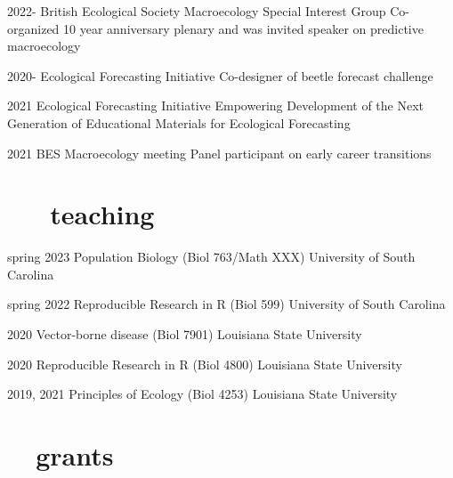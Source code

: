 \documentclass[]{CV}
\begin{document}
\begin{entrylist}

  \entry
    {2022-}
		{British Ecological Society Macroecology Special Interest Group}
    {Co-organized 10 year anniversary plenary and was invited speaker on predictive macroecology}

  \entry
    {2020-}
		{Ecological Forecasting Initiative }
    {Co-designer of beetle forecast challenge}

  \entry
    {2021}
		{Ecological Forecasting Initiative}
    {Empowering Development of the Next Generation of Educational Materials for Ecological Forecasting}

  \entry
    {2021}
		{BES Macroecology meeting}
    {Panel participant on early career transitions}

\end{entrylist}












\section{ \faInstitution \ \ \ teaching}

\begin{entrylist}

  \entry
    {spring 2023}
		{Population Biology (Biol 763/Math XXX)} %
    {University of South Carolina}


  \entry
    {spring 2022}
		{Reproducible Research in R (Biol 599)}
    {University of South Carolina}

  \entry
    {2020}
		{Vector-borne disease (Biol 7901)}
    {Louisiana State University}

  \entry
    {2020}
		{Reproducible Research in R (Biol 4800)}
    {Louisiana State University}

  \entry
    {2019, 2021}
		{Principles of Ecology (Biol 4253)}
    {Louisiana State University}

\end{entrylist}










\section{\faDollar \ \ grants}
\end{document}
